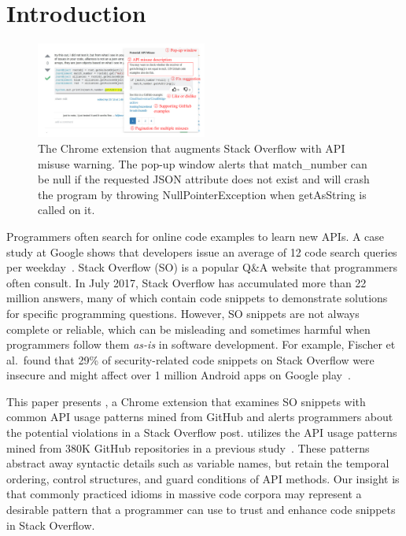 \section{Introduction}
\label{sec:intro}

\begin{figure}
\centering
\includegraphics[width=0.5\textwidth]{soap-v4.pdf}
  \caption{The {\tool} Chrome extension that augments Stack Overflow with API misuse warning. The pop-up window alerts that {\ttt match\_number} can be {\ttt null} if the requested {\ttt JSON} attribute does not exist and will crash the program by throwing {\ttt NullPointerException} when {\ttt getAsString} is called on it.}
  \label{fig:screenshot}
\end{figure}

Programmers often search for online code examples to learn new APIs. A case study at Google shows that developers issue an average of 12 code search queries per weekday~\cite{sadowski2015developers}. Stack Overflow (SO) is a popular Q\&A website that programmers often consult. In July 2017, Stack Overflow has accumulated more than 22 million answers, many of which contain code snippets to demonstrate solutions for specific programming questions. However, SO snippets are not always complete or reliable, which can be misleading and sometimes harmful when programmers follow them {\em as-is} in software development. For example, Fischer et al.~found that 29\% of security-related code snippets on Stack Overflow were insecure and might affect over 1 million Android apps on Google play~\cite{fischer2017stack}. 

This paper presents {\tool}, a Chrome extension that examines SO snippets with common API usage patterns mined from GitHub and alerts programmers about the potential violations in a Stack Overflow post. {\tool} utilizes the API usage patterns mined from 380K GitHub repositories in a previous study~\cite{zhang2018code}. These patterns abstract away syntactic details such as variable names, but retain the temporal ordering, control structures, and guard conditions of API methods. Our insight is that commonly practiced idioms in massive code corpora may represent a desirable pattern that a programmer can use to trust and enhance code snippets in Stack Overflow. 

